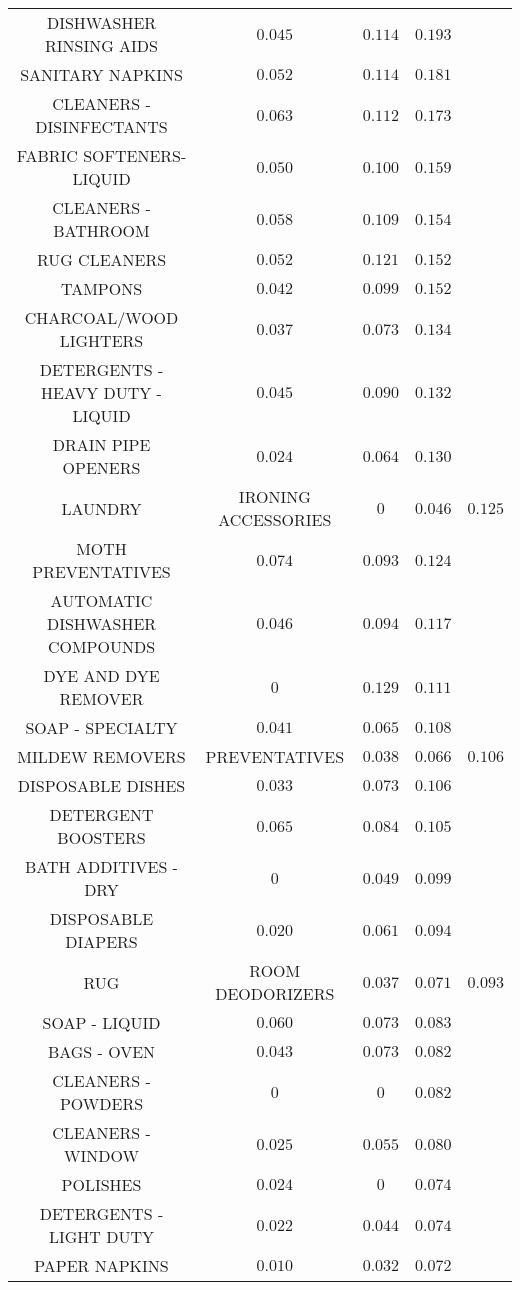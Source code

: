 \begin{table}[!htbp]
\begin{tabular}{@{\extracolsep{5pt}} cccc}
DISHWASHER RINSING AIDS & $0.045$ & $0.114$ & $0.193$ \\ 
SANITARY NAPKINS & $0.052$ & $0.114$ & $0.181$ \\ 
CLEANERS - DISINFECTANTS & $0.063$ & $0.112$ & $0.173$ \\ 
FABRIC SOFTENERS-LIQUID & $0.050$ & $0.100$ & $0.159$ \\ 
CLEANERS - BATHROOM & $0.058$ & $0.109$ & $0.154$ \\ 
RUG CLEANERS & $0.052$ & $0.121$ & $0.152$ \\ 
TAMPONS & $0.042$ & $0.099$ & $0.152$ \\ 
CHARCOAL/WOOD LIGHTERS & $0.037$ & $0.073$ & $0.134$ \\ 
DETERGENTS - HEAVY DUTY - LIQUID & $0.045$ & $0.090$ & $0.132$ \\ 
DRAIN PIPE OPENERS & $0.024$ & $0.064$ & $0.130$ \\ 
LAUNDRY & IRONING ACCESSORIES & $0$ & $0.046$ & $0.125$ \\ 
MOTH PREVENTATIVES & $0.074$ & $0.093$ & $0.124$ \\ 
AUTOMATIC DISHWASHER COMPOUNDS & $0.046$ & $0.094$ & $0.117$ \\ 
DYE AND DYE REMOVER & $0$ & $0.129$ & $0.111$ \\ 
SOAP - SPECIALTY & $0.041$ & $0.065$ & $0.108$ \\ 
MILDEW REMOVERS & PREVENTATIVES & $0.038$ & $0.066$ & $0.106$ \\ 
DISPOSABLE DISHES & $0.033$ & $0.073$ & $0.106$ \\ 
DETERGENT BOOSTERS & $0.065$ & $0.084$ & $0.105$ \\ 
BATH ADDITIVES - DRY & $0$ & $0.049$ & $0.099$ \\ 
DISPOSABLE DIAPERS & $0.020$ & $0.061$ & $0.094$ \\ 
RUG & ROOM DEODORIZERS & $0.037$ & $0.071$ & $0.093$ \\ 
SOAP - LIQUID & $0.060$ & $0.073$ & $0.083$ \\ 
BAGS - OVEN & $0.043$ & $0.073$ & $0.082$ \\ 
CLEANERS - POWDERS & $0$ & $0$ & $0.082$ \\ 
CLEANERS - WINDOW & $0.025$ & $0.055$ & $0.080$ \\ 
POLISHES & $0.024$ & $0$ & $0.074$ \\ 
DETERGENTS - LIGHT DUTY & $0.022$ & $0.044$ & $0.074$ \\ 
PAPER NAPKINS & $0.010$ & $0.032$ & $0.072$ \\ 

\end{tabular}
\end{table}
